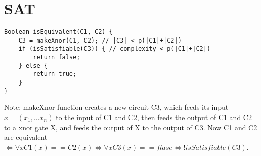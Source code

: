 \documentclass{article}
\begin{document}
\section{SAT}
\begin{lstlisting}
Boolean isEquivalent(C1, C2) {
	C3 = makeXnor(C1, C2); // |C3| < p(|C1|+|C2|)
	if (isSatisfiable(C3)) { // complexity < p(|C1|+|C2|)
		return false;
	} else {
		return true;
	}
}
\end{lstlisting}
Note: makeXnor function creates a new circuit C3, which feeds its input $x = (x_1,
\ldots x_n)$ to the input of C1 and C2, then feeds the output of C1 and C2 to a
xnor gate X, and feeds the output of X to the output of C3. Now C1 and
C2 are equivalent $\iff \forall x C1(x) == C2(x) \iff \forall x C3(x) == flase
\iff !isSatisfiable(C3)$.
\end{document}
